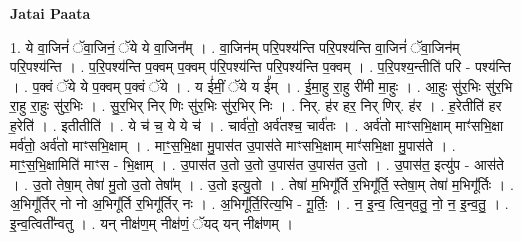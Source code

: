 \documentclass[17pt]{extarticle}
\begin{document}
\textbf{Jatai Paata} \newline

1. ये वा॒जिनं॑ ॅवा॒जिनं॒ ॅये ये वा॒जिन᳚म् । . वा॒जिन॑म् परि॒पश्य॑न्ति परि॒पश्य॑न्ति वा॒जिनं॑ ॅवा॒जिन॑म् परि॒पश्य॑न्ति । . प॒रि॒पश्य॑न्ति प॒क्वम् प॒क्वम् प॑रि॒पश्य॑न्ति परि॒पश्य॑न्ति प॒क्वम् । . प॒रि॒पश्य॒न्तीति॑ परि - पश्य॑न्ति । . प॒क्वं ॅये ये प॒क्वम् प॒क्वं ॅये । . य ई॑मीं॒ ॅये य ई᳚म् । . ई॒मा॒हु रा॒हु री॑मी मा॒हुः । . आ॒हुः सु॑र॒भिः सु॑र॒भि रा॒हु रा॒हुः सु॑र॒भिः । . सु॒र॒भिर् निर् णिः सु॑र॒भिः सु॑र॒भिर् निः । . निर्. ह॑र हर॒ निर् णिर्. ह॑र । . ह॒रेतीति॑ हर ह॒रेति॑ । . इतीतीति॑ । . ये च॑ च॒ ये ये च॑ । . चार्व॑तो॒ अर्व॑तश्च॒ चार्व॑तः । . अर्व॑तो माꣳसभि॒क्षाम् माꣳ॑सभि॒क्षा मर्व॑तो॒ अर्व॑तो माꣳसभि॒क्षाम् । . माꣳ॒॒स॒भि॒क्षा मु॒पास॑त उ॒पास॑ते माꣳसभि॒क्षाम् माꣳ॑सभि॒क्षा मु॒पास॑ते । . माꣳ॒॒स॒भि॒क्षामिति॑ माꣳस - भि॒क्षाम् । . उ॒पास॑त उ॒तो उ॒तो उ॒पास॑त उ॒पास॑त उ॒तो । . उ॒पास॑त॒ इत्यु॑प - आस॑ते । . उ॒तो तेषा॒म् तेषा॑ मु॒तो उ॒तो तेषा᳚म् । . उ॒तो इत्यु॒तो । . तेषा॑ म॒भिगू᳚र्ति र॒भिगू᳚र्ति॒ स्तेषा॒म् तेषा॑ म॒भिगू᳚र्तिः । . अ॒भिगू᳚र्तिर् नो नो अ॒भिगू᳚र्ति र॒भिगू᳚र्तिर् नः । . अ॒भिगू᳚र्ति॒रित्य॒भि - गू॒र्तिः॒ । . न॒ इ॒न्व॒ त्वि॒न्‌व॒तु॒ नो॒ न॒ इ॒न्व॒तु॒ । . इ॒न्व॒त्विती᳚न्वतु । . यन् नीक्ष॑ण॒म् नीक्ष॑णं॒ ॅयद् यन् नीक्ष॑णम् । \newline
\end{document}
